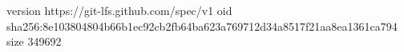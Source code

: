 version https://git-lfs.github.com/spec/v1
oid sha256:8e103804804b66b1ec92cb2fb64ba623a769712d34a8517f21aa8ea1361ca794
size 349692
